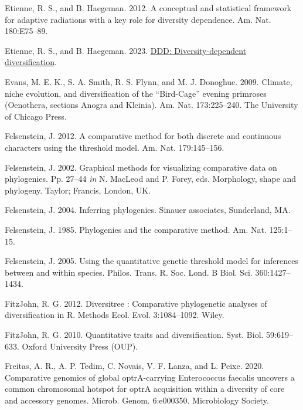 \documentclass[fleqn,10pt,lineno]{wlpeerj} %
\newlength{\cslhangindent}
\newlength{\cslentryspacingunit} %
\newenvironment{CSLReferences}[2] %
 {%
  \setlength{\parindent}{0pt}
  \ifodd #1
  \let\oldpar\par
  \def\par{\hangindent=\cslhangindent\oldpar}
  \fi
  \setlength{\parskip}{#2\cslentryspacingunit}
 }%
 {}
\begin{document}
\begin{CSLReferences}{1}{0}
\leavevmode{}%
Etienne, R. S., and B. Haegeman. 2012. A conceptual and statistical framework for adaptive radiations with a key role for diversity dependence. Am. Nat. 180:E75--89.

\leavevmode{}%
Etienne, R. S., and B. Haegeman. 2023. \href{https://CRAN.R-project.org/package=DDD}{DDD: Diversity-dependent diversification}.

\leavevmode{}%
Evans, M. E. K., S. A. Smith, R. S. Flynn, and M. J. Donoghue. 2009. Climate, niche evolution, and diversification of the {{``Bird-Cage''}} evening primroses ({O}enothera, sections {A}nogra and {K}leinia). Am. Nat. 173:225--240. The University of Chicago Press.

\leavevmode{}%
Felsenstein, J. 2012. A comparative method for both discrete and continuous characters using the threshold model. Am. Nat. 179:145--156.

\leavevmode{}%
Felsenstein, J. 2002. Graphical methods for visualizing comparative data on phylogenies. Pp. 27--44 \emph{in} N. MacLeod and P. Forey, eds. Morphology, shape and phylogeny. Taylor; Francis, London, UK.

\leavevmode{}%
Felsenstein, J. 2004. Inferring phylogenies. Sinauer associates, Sunderland, MA.

\leavevmode{}%
Felsenstein, J. 1985. Phylogenies and the comparative method. Am. Nat. 125:1--15.

\leavevmode{}%
Felsenstein, J. 2005. Using the quantitative genetic threshold model for inferences between and within species. Philos. Trans. R. Soc. Lond. B Biol. Sci. 360:1427--1434.

\leavevmode{}%
FitzJohn, R. G. 2012. Diversitree : Comparative phylogenetic analyses of diversification in {R}. Methods Ecol. Evol. 3:1084--1092. Wiley.

\leavevmode{}%
FitzJohn, R. G. 2010. Quantitative traits and diversification. Syst. Biol. 59:619--633. Oxford University Press (OUP).

\leavevmode{}%
Freitas, A. R., A. P. Tedim, C. Novais, V. F. Lanza, and L. Peixe. 2020. Comparative genomics of global optr{A}-carrying {Enterococcus faecalis} uncovers a common chromosomal hotspot for optr{A} acquisition within a diversity of core and accessory genomes. Microb. Genom. 6:e000350. Microbiology Society.


\end{CSLReferences}
\end{document}

